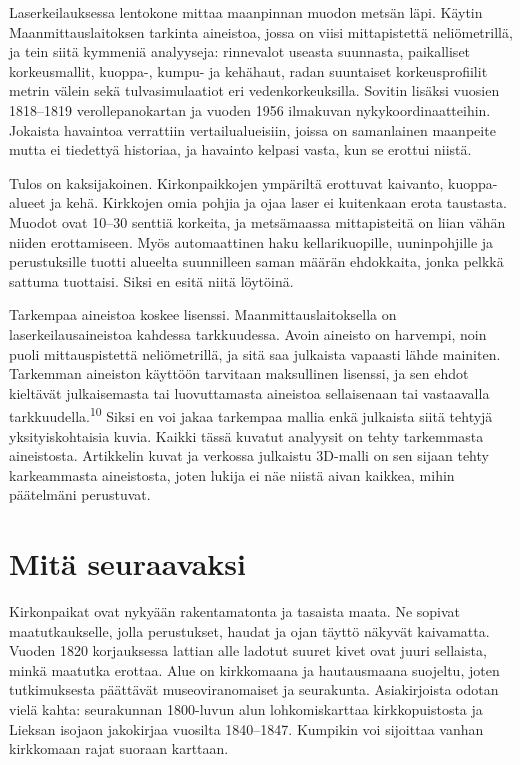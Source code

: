\documentclass[11pt,a4paper]{article}
\newcommand{\viite}[1]{\textsuperscript{\sffamily\color{leima}#1}}
\begin{document}
Laserkeilauksessa lentokone mittaa maanpinnan muodon metsän läpi. Käytin Maanmittauslaitoksen tarkinta aineistoa, jossa on viisi mittapistettä neliömetrillä, ja tein siitä kymmeniä analyyseja: rinnevalot useasta suunnasta, paikalliset korkeusmallit, kuoppa-, kumpu- ja kehähaut, radan suuntaiset korkeusprofiilit metrin välein sekä tulvasimulaatiot eri vedenkorkeuksilla. Sovitin lisäksi vuosien 1818--1819 verollepanokartan ja vuoden 1956 ilmakuvan nykykoordinaatteihin. Jokaista havaintoa verrattiin vertailualueisiin, joissa on samanlainen maanpeite mutta ei tiedettyä historiaa, ja havainto kelpasi vasta, kun se erottui niistä.

Tulos on kaksijakoinen. Kirkonpaikkojen ympäriltä erottuvat kaivanto, kuoppa-alueet ja kehä. Kirkkojen omia pohjia ja ojaa laser ei kuitenkaan erota taustasta. Muodot ovat 10--30 senttiä korkeita, ja metsämaassa mittapisteitä on liian vähän niiden erottamiseen. Myös automaattinen haku kellarikuopille, uuninpohjille ja perustuksille tuotti alueelta suunnilleen saman määrän ehdokkaita, jonka pelkkä sattuma tuottaisi. Siksi en esitä niitä löytöinä.

Tarkempaa aineistoa koskee lisenssi. Maanmittauslaitoksella on laserkeilausaineistoa kahdessa tarkkuudessa. Avoin aineisto on harvempi, noin puoli mittauspistettä neliömetrillä, ja sitä saa julkaista vapaasti lähde mainiten. Tarkemman aineiston käyttöön tarvitaan maksullinen lisenssi, ja sen ehdot kieltävät julkaisemasta tai luovuttamasta aineistoa sellaisenaan tai vastaavalla tarkkuudella.\viite{10} Siksi en voi jakaa tarkempaa mallia enkä julkaista siitä tehtyjä yksityiskohtaisia kuvia. Kaikki tässä kuvatut analyysit on tehty tarkemmasta aineistosta. Artikkelin kuvat ja verkossa julkaistu 3D-malli on sen sijaan tehty karkeammasta aineistosta, joten lukija ei näe niistä aivan kaikkea, mihin päätelmäni perustuvat.


\section{Mitä seuraavaksi}

Kirkonpaikat ovat nykyään rakentamatonta ja tasaista maata. Ne sopivat maatutkaukselle, jolla perustukset, haudat ja ojan täyttö näkyvät kaivamatta. Vuoden 1820 korjauksessa lattian alle ladotut suuret kivet ovat juuri sellaista, minkä maatutka erottaa. Alue on kirkkomaana ja hautausmaana suojeltu, joten tutkimuksesta päättävät museoviranomaiset ja seurakunta. Asiakirjoista odotan vielä kahta: seurakunnan 1800-luvun alun lohkomiskarttaa kirkkopuistosta ja Lieksan isojaon jakokirjaa vuosilta 1840--1847. Kumpikin voi sijoittaa vanhan kirkkomaan rajat suoraan karttaan.
\end{document}
